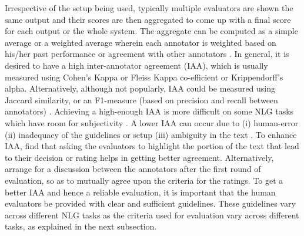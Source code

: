 Irrespective of the setup being used, typically multiple evaluators are shown the same output and their scores are then aggregated to come up with a final score for each output or the whole system. The aggregate can be computed as a simple average or a weighted average wherein each annotator is weighted based on his/her past performance or agreement with other annotators . In general, it is desired to have a high inter-annotator agreement (IAA), which is usually measured using Cohen's Kappa or Fleiss Kappa co-efficient or Krippendorff’s alpha.  
Alternatively, although not popularly, IAA could be measured using Jaccard similarity, or an F1-measure (based on precision and recall between annotators) . 
Achieving a high-enough IAA is more difficult on some NLG tasks which have room for subjectivity . A lower IAA can occur due to (i) human-error (ii) inadequacy of the guidelines or setup (iii) ambiguity in the text .  
To enhance IAA,  find that asking the evaluators to highlight the portion of the text that lead to their decision or rating helps in getting better agreement. Alternatively,  arrange for a discussion between the annotators after the first round of evaluation, so as to mutually agree upon the criteria for the ratings.
To get a better IAA and hence a reliable evaluation, it is important that the human evaluators be provided with clear and sufficient guidelines. These guidelines vary across different NLG tasks as the criteria used for evaluation vary across different tasks, as explained in the next subsection.

